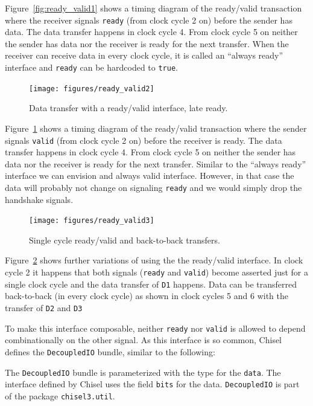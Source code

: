 \documentclass[%
    10pt,
    headinclude, footexclude,
    openright, %
    notitlepage,
    cleardoubleempty,
    headsepline,
    pointlessnumbers,
    bibtotoc, idxtotoc,
    ]{scrbook}
\newcommand{\code}[1]{{\lstinline[basicstyle=\small\ttfamily]{#1}}}
\begin{document}
Figure~\ref{fig:ready_valid1} shows a timing diagram of the ready/valid
transaction where the receiver signals \code{ready} (from clock cycle 2 on)
before the sender has data. The data transfer happens in clock cycle 4.
From clock cycle 5 on neither the sender has data nor the receiver is ready
for the next transfer.
When the receiver can receive data in every clock cycle, it is called an
``always ready'' interface and \code{ready} can be hardcoded to \code{true}.

\begin{figure}
  \centering
  \texttt{[image: figures/ready\_valid2]}
  \caption{Data transfer with a ready/valid interface, late ready.}
  \label{fig:ready_valid2}
\end{figure}

Figure~\ref{fig:ready_valid2} shows a timing diagram of the ready/valid
transaction where the sender signals \code{valid} (from clock cycle 2 on)
before the receiver is ready. The data transfer happens in clock cycle 4.
From clock cycle 5 on neither the sender has data nor the receiver is ready
for the next transfer.
Similar to the ``always ready'' interface we can envision and always valid
interface. However, in that case the data will probably not change on signaling
\code{ready} and we would simply drop the handshake signals.

\begin{figure}
  \centering
  \texttt{[image: figures/ready\_valid3]}
  \caption{Single cycle ready/valid and back-to-back transfers.}
  \label{fig:ready_valid3}
\end{figure}

Figure~\ref{fig:ready_valid3} shows further variations of using the the ready/valid
interface. In clock cycle 2 it happens that both signals (\code{ready} and \code{valid})
become asserted just for a single clock cycle and the data transfer
of \code{D1} happens. Data can be transferred back-to-back (in every
clock cycle) as shown in clock cycles 5 and 6 with the transfer of
\code{D2} and \code{D3}

To make this interface composable, neither \code{ready} nor \code{valid} is
allowed to depend combinationally on the other signal.
As this interface is so common, Chisel defines the \code{DecoupledIO}
bundle, similar to the following:


\noindent The \code{DecoupledIO} bundle is parameterized with the type for
the \code{data}. The interface defined by Chisel uses the field \code{bits}
for the data. \code{DecoupledIO} is part of the package \code{chisel3.util}.
\end{document}

